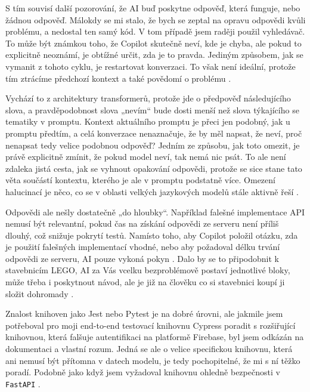 \documentclass[FM,DP]{tulthesis}
\begin{document}
		S tím souvisí další pozorování, že AI buď poskytne odpověď, která funguje, nebo žádnou odpověď. Málokdy se mi stalo, že bych se zeptal na opravu odpovědi kvůli problému, a nedostal ten samý kód. V tom případě jsem raději použil vyhledávač. To může být známkou toho, že Copilot skutečně neví, kde je chyba, ale pokud to explicitně neoznámí, je obtížné určit, zda je to pravda. Jediným způsobem, jak se vymanit z tohoto cyklu, je restartovat konverzaci. To však není ideální, protože tím ztrácíme předchozí kontext a také povědomí o problému \cite{mocking_fail}.
		
		Vychází to z architektury transformerů, protože jde o předpověď následujícího slova, a pravděpodobnost slova „nevím“ bude dosti menší než slova týkajícího se tematiky v promptu. Kontext aktuálního promptu je přeci jen podobný, jak u promptu předtím, a celá konverzace nenaznačuje, že by měl napsat, že neví, proč nenapsat tedy velice podobnou odpověď? Jedním ze způsobu, jak toto omezit, je právě explicitně zmínit, že pokud model neví, tak nemá nic psát. To ale není zdaleka jistá cesta, jak se vyhnout opakování odpovědi, protože se sice stane tato věta součástí kontextu, kterého je ale v promptu podstatně více. Omezení halucinací je něco, co se v oblasti velkých jazykových modelů stále aktivně řeší \cite{jing2024fgaif}.
		
		Odpovědi ale nešly dostatečně „do hloubky“. Například falešné implementace API nemusí být relevantní, pokud čas na získání odpovědi ze serveru není příliš dlouhý, což snižuje pokrytí testů. Namísto toho, aby Copilot položil otázku, zda je použití falešných implementací vhodné, nebo aby požadoval délku trvání odpovědi ze serveru, AI pouze vykoná pokyn \cite{mocking_fail}. Dalo by se to připodobnit k stavebnicím LEGO, AI za Vás vcelku bezproblémově postaví jednotlivé bloky, může třeba i poskytnout návod, ale je již na člověku co si stavebnici koupí ji složit dohromady \cite{testing} \cite{mocking} \cite{mocking_fail}.
		
		Znalost knihoven jako Jest nebo Pytest je na dobré úrovni, ale jakmile jsem potřeboval pro moji end-to-end testovací knihovnu Cypress poradit s rozšiřující knihovnou, která falšuje autentifikaci na platformě Firebase, byl jsem odkázán na dokumentaci a vlastní rozum. Jedná se ale o velice specifickou knihovnu, která ani nemusí být přítomna v datech modelu, je tedy pochopitelné, že mi s ní těžko poradí. Podobně jako když jsem vyžadoval knihovnu ohledně bezpečnosti v \verb|FastAPI| \cite{end2end_fb} \cite{firebase_auth} \cite{firebase} \cite{jest} \cite{pytest} \cite{cypress}. 
		
\end{document}
